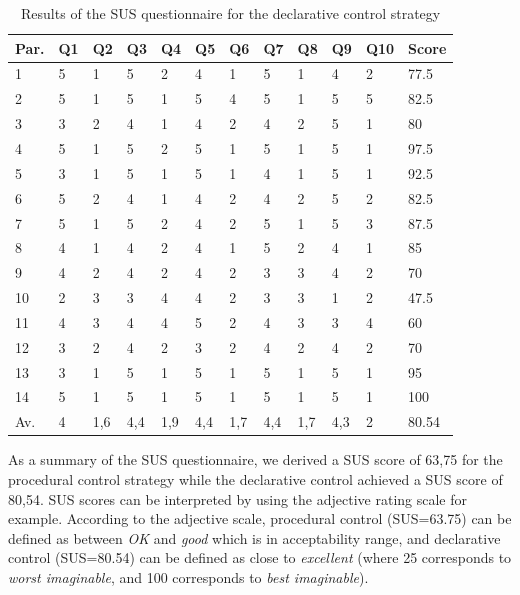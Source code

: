 \documentclass[10pt, conference]{IEEEtran}
\begin{document}
\begin{table}[]
\begin{tabular}{m{1em} m{1em} m{1em} m{1em} m{1em} m{1em} m{1em} m{1em} m{1em} m{1em} m{1em} m{3em}}
\hline
Par.    & Q1 & Q2 & Q3 & Q4 & Q5 & Q6 & Q7 & Q8 & Q9 & Q10 & Score \\
\hline
1       & 5   & 1   & 5   & 2   & 4   & 1   & 5   & 1   & 4   & 2    & 77.5  \\
2       & 5   & 1   & 5   & 1   & 5   & 4   & 5   & 1   & 5   & 5    & 82.5  \\
3       & 3   & 2   & 4   & 1   & 4   & 2   & 4   & 2   & 5   & 1    & 80    \\
4       & 5   & 1   & 5   & 2   & 5   & 1   & 5   & 1   & 5   & 1    & 97.5  \\
5       & 3   & 1   & 5   & 1   & 5   & 1   & 4   & 1   & 5   & 1    & 92.5  \\
6       & 5   & 2   & 4   & 1   & 4   & 2   & 4   & 2   & 5   & 2    & 82.5  \\
7       & 5   & 1   & 5   & 2   & 4   & 2   & 5   & 1   & 5   & 3    & 87.5  \\
8       & 4   & 1   & 4   & 2   & 4   & 1   & 5   & 2   & 4   & 1    & 85    \\
9       & 4   & 2   & 4   & 2   & 4   & 2   & 3   & 3   & 4   & 2    & 70    \\
10      & 2   & 3   & 3   & 4   & 4   & 2   & 3   & 3   & 1   & 2    & 47.5  \\
11      & 4   & 3   & 4   & 4   & 5   & 2   & 4   & 3   & 3   & 4    & 60    \\
12      & 3   & 2   & 4   & 2   & 3   & 2   & 4   & 2   & 4   & 2    & 70    \\
13      & 3   & 1   & 5   & 1   & 5   & 1   & 5   & 1   & 5   & 1    & 95    \\
14      & 5   & 1   & 5   & 1   & 5   & 1   & 5   & 1   & 5   & 1    & 100   \\
    \hline
Av. & 4   & 1,6 & 4,4 & 1,9 & 4,4 & 1,7 & 4,4 & 1,7 & 4,3 & 2    & 80.54 \\
    \hline
\end{tabular}
\caption{Results of the SUS questionnaire for the declarative control strategy}
\label{SUS_answers_dec}
\end{table}

As a summary of the SUS questionnaire, we derived a SUS score of 63,75 for the procedural control strategy while the declarative control achieved a SUS score of 80,54. SUS scores can be interpreted by using the adjective rating scale \cite{sus_adjective_scale} for example. According to the adjective scale, procedural control (SUS=63.75) can be defined as between \textit{OK} and \textit{good} which is in acceptability range, and declarative control (SUS=80.54) can be defined as close to \textit{excellent} (where 25 corresponds to \textit{worst imaginable}, and 100 corresponds to \textit{best imaginable}).
\end{document}
